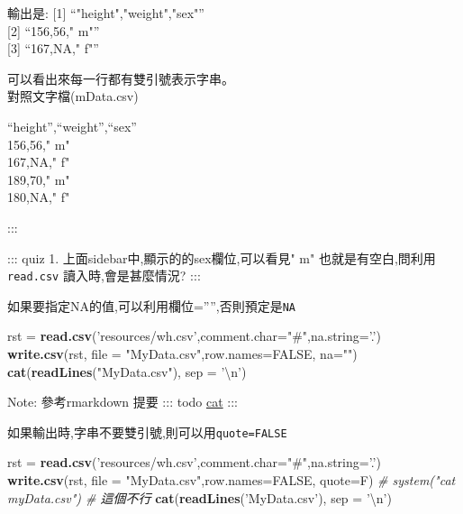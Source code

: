 \documentclass[]{book}
\newenvironment{Shaded}{\begin{snugshade}}{\end{snugshade}}
\newcommand{\KeywordTok}[1]{\textcolor[rgb]{0.13,0.29,0.53}{\textbf{#1}}}
\newcommand{\DataTypeTok}[1]{\textcolor[rgb]{0.13,0.29,0.53}{#1}}
\newcommand{\CharTok}[1]{\textcolor[rgb]{0.31,0.60,0.02}{#1}}
\newcommand{\StringTok}[1]{\textcolor[rgb]{0.31,0.60,0.02}{#1}}
\newcommand{\CommentTok}[1]{\textcolor[rgb]{0.56,0.35,0.01}{\textit{#1}}}
\newcommand{\OtherTok}[1]{\textcolor[rgb]{0.56,0.35,0.01}{#1}}
\newcommand{\NormalTok}[1]{#1}
\theoremstyle{definition}
\theoremstyle{definition}
\theoremstyle{definition}
\theoremstyle{remark}
\begin{document}
輸出是: {[}1{]} ``"height","weight","sex"''\\
{[}2{]} ``156,56," m"''\\
{[}3{]} ``167,NA," f"''

可以看出來每一行都有雙引號表示字串。\\
對照文字檔(mData.csv)

``height'',``weight'',``sex''\\
156,56," m"\\
167,NA," f"\\
189,70," m"\\
180,NA," f"

:::

::: quiz 1. 上面sidebar中,顯示的的sex欄位,可以看見" m"
也就是有空白,問利用\texttt{read.csv} 讀入時,會是甚麼情況? :::

如果要指定NA的值,可以利用欄位='''',否則預定是\texttt{NA}

\begin{Shaded}
\begin{Highlighting}[]
\NormalTok{rst =}\StringTok{ }\KeywordTok{read.csv}\NormalTok{(}\StringTok{'resources/wh.csv'}\NormalTok{,}\DataTypeTok{comment.char=}\StringTok{"#"}\NormalTok{,}\DataTypeTok{na.string=}\StringTok{'.'}\NormalTok{)}
\KeywordTok{write.csv}\NormalTok{(rst, }\DataTypeTok{file =} \StringTok{"MyData.csv"}\NormalTok{,}\DataTypeTok{row.names=}\OtherTok{FALSE}\NormalTok{, }\DataTypeTok{na=}\StringTok{""}\NormalTok{)}
\KeywordTok{cat}\NormalTok{(}\KeywordTok{readLines}\NormalTok{(}\StringTok{"MyData.csv"}\NormalTok{), }\DataTypeTok{sep =} \StringTok{'}\CharTok{\textbackslash{}n}\StringTok{'}\NormalTok{)}
\end{Highlighting}
\end{Shaded}

Note: 參考rmarkdown 提要 ::: todo
\href{doc:rmarkdown01\#terminal-out}{cat} :::

如果輸出時,字串不要雙引號,則可以用\texttt{quote=FALSE}

\begin{Shaded}
\begin{Highlighting}[]
\NormalTok{rst =}\StringTok{ }\KeywordTok{read.csv}\NormalTok{(}\StringTok{'resources/wh.csv'}\NormalTok{,}\DataTypeTok{comment.char=}\StringTok{"#"}\NormalTok{,}\DataTypeTok{na.string=}\StringTok{'.'}\NormalTok{)}
\KeywordTok{write.csv}\NormalTok{(rst, }\DataTypeTok{file =} \StringTok{"MyData.csv"}\NormalTok{,}\DataTypeTok{row.names=}\OtherTok{FALSE}\NormalTok{, }\DataTypeTok{quote=}\NormalTok{F)}
\CommentTok{# system("cat myData.csv") # 這個不行}
\KeywordTok{cat}\NormalTok{(}\KeywordTok{readLines}\NormalTok{(}\StringTok{'MyData.csv'}\NormalTok{), }\DataTypeTok{sep =} \StringTok{'}\CharTok{\textbackslash{}n}\StringTok{'}\NormalTok{)}
\end{Highlighting}
\end{Shaded}
\end{document}
